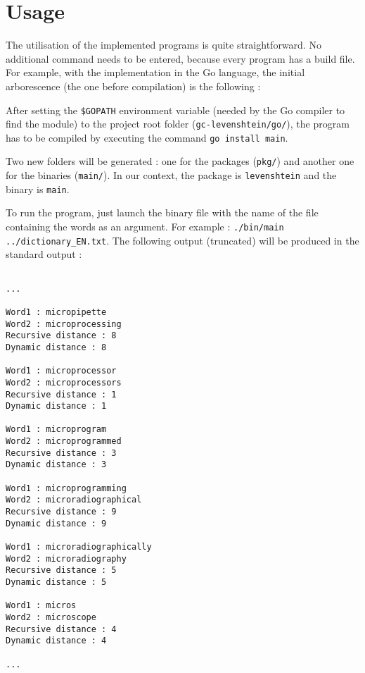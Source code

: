 \section{Usage}
\label{sec:Usage}
The utilisation of the implemented programs is quite straightforward. No additional command needs to be entered, because every program has a build file. For example, with the implementation in the Go language, the initial arborescence (the one before compilation) is the following :

\begin{figure}[H]
\end{figure}

After setting the \verb+$GOPATH+ environment variable (needed by the Go compiler to find the module) to the project root folder (\verb+gc-levenshtein/go/+), the program has to be compiled by executing the command \verb+go install main+.
\par Two new folders will be generated : one for the packages (\verb+pkg/+) and another one for the binaries (\verb+main/+). In our context, the package is \verb+levenshtein+ and the binary is \verb+main+.

\begin{figure}[H]
\end{figure}

To run the program, just launch the binary file with the name of the file containing the words as an argument. For example : \verb+./bin/main ../dictionary_EN.txt+. The following output (truncated) will be produced in the standard output :

\begin{lstlisting}[breaklines]

...

Word1 : micropipette
Word2 : microprocessing
Recursive distance : 8
Dynamic distance : 8

Word1 : microprocessor
Word2 : microprocessors
Recursive distance : 1
Dynamic distance : 1

Word1 : microprogram
Word2 : microprogrammed
Recursive distance : 3
Dynamic distance : 3

Word1 : microprogramming
Word2 : microradiographical
Recursive distance : 9
Dynamic distance : 9

Word1 : microradiographically
Word2 : microradiography
Recursive distance : 5
Dynamic distance : 5

Word1 : micros
Word2 : microscope
Recursive distance : 4
Dynamic distance : 4

...

\end{lstlisting}